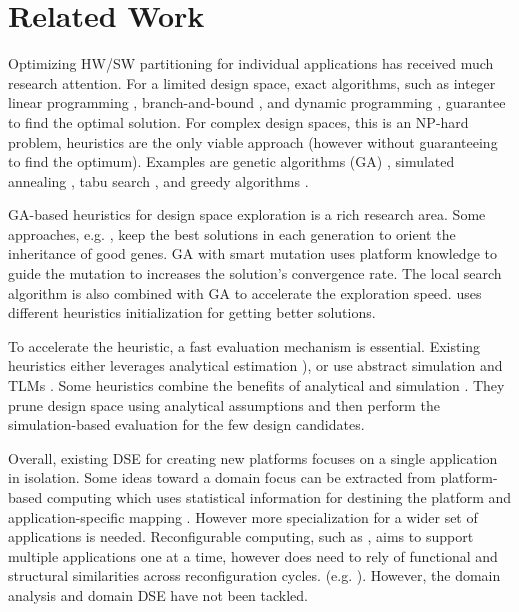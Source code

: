 \section{Related Work}
\label{sec:related}
Optimizing HW/SW partitioning for individual applications has received much research attention. For a limited design space, exact algorithms, such as integer linear programming \cite{kuang2005partitioning}, branch-and-bound \cite{jigang2004branch}, and dynamic programming \cite{wu2006low}, guarantee to find the optimal solution. For complex design spaces, this is an NP-hard problem, heuristics are the only viable approach (however without guaranteeing to find the optimum). Examples are genetic algorithms (GA) \cite{quan2014towards, alexandrescu2011genetic, wen2011heuristic, page2010multi}, simulated annealing \cite{liang2013hardware}, tabu search \cite{wu2013efficient}, and greedy algorithms \cite{tang2015hardware}. 

GA-based heuristics for design space exploration is a rich research area. Some approaches, e.g. \cite{quan2014towards}, keep the best solutions in each generation to orient the inheritance of good genes. GA with smart mutation \cite{alexandrescu2011genetic} uses platform knowledge to guide the mutation to increases the solution's convergence rate. The local search algorithm is also combined with GA \cite{wen2011heuristic} to accelerate the exploration speed. \cite{page2010multi} uses different heuristics initialization for getting better solutions. 
 
To accelerate the heuristic, a fast evaluation mechanism is essential. Existing heuristics either leverages analytical estimation \cite{pinedo2016scheduling, omara2010genetic}), or use abstract simulation and TLMs \cite{pimentel2006systematic, ghenassia2005transaction}. Some heuristics combine the benefits of analytical and simulation \cite{zhang2014automatic, mariani2010correlation}. They prune design space using analytical assumptions and then perform the simulation-based evaluation for the few design candidates.

Overall, existing DSE for creating new platforms focuses on a single application in isolation. Some ideas toward a domain focus can be extracted from platform-based computing which uses statistical information for destining the platform and application-specific mapping \cite{graf2014multi, gladigau2010system}. However more specialization for a wider set of applications is needed. Reconfigurable computing, such as \cite{wildermann2011operational}, aims to support multiple applications one at a time, however does need to rely of functional and structural similarities across reconfiguration cycles.
 (e.g. \cite{tabkhi2014function, nowatzki2017domain}). However, the domain analysis and domain DSE have not been tackled.

